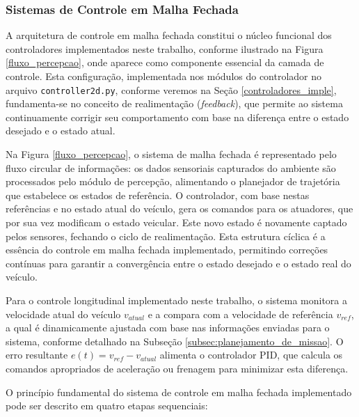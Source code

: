 \subsubsection{Sistemas de Controle em Malha Fechada} \label{subsubsec:malha_fechada}

A arquitetura de controle em malha fechada constitui o núcleo funcional dos controladores implementados neste trabalho, conforme ilustrado na Figura \ref{fluxo_percepcao}, onde aparece como componente essencial da camada de controle. Esta configuração, implementada nos módulos do controlador no arquivo \texttt{controller2d.py}, conforme veremos na Seção \ref{controladores_imple}, fundamenta-se no conceito de realimentação (\textit{feedback}), que permite ao sistema continuamente corrigir seu comportamento com base na diferença entre o estado desejado e o estado atual.

Na Figura \ref{fluxo_percepcao}, o sistema de malha fechada é representado pelo fluxo circular de informações: os dados sensoriais capturados do ambiente são processados pelo módulo de percepção, alimentando o planejador de trajetória que estabelece os estados de referência. O controlador, com base nestas referências e no estado atual do veículo, gera os comandos para os atuadores, que por sua vez modificam o estado veicular. Este novo estado é novamente captado pelos sensores, fechando o ciclo de realimentação. Esta estrutura cíclica é a essência do controle em malha fechada implementado, permitindo correções contínuas para garantir a convergência entre o estado desejado e o estado real do veículo.

Para o controle longitudinal implementado neste trabalho, o sistema monitora a velocidade atual do veículo $v_{atual}$ e a compara com a velocidade de referência $v_{ref}$, a qual é dinamicamente ajustada com base nas informações enviadas para o sistema, conforme detalhado na Subseção \ref{subsec:planejamento_de_missao}. O erro resultante $e(t) = v_{ref} - v_{atual}$ alimenta o controlador PID, que calcula os comandos apropriados de aceleração ou frenagem para minimizar esta diferença.

O princípio fundamental do sistema de controle em malha fechada implementado pode ser descrito em quatro etapas sequenciais:

